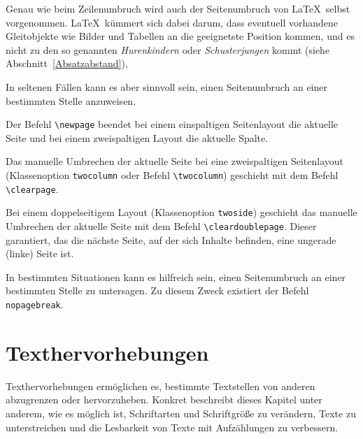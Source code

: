 \documentclass[a4paper,10pt,twoside]{scrbook}
\begin{document}
Genau wie beim Zeilenumbruch wird auch 
der Seitenumbruch von \LaTeX\ selbst
vorgenommen. \LaTeX\ kümmert sich dabei 
darum, dass eventuell vorhandene
Gleitobjekte wie Bilder und Tabellen an die geeignetste Position 
kommen, und es nicht zu den so genannten
\textsl{Hurenkindern} oder \textsl{Schusterjungen} kommt (siehe Abschnitt~\ref{Absatzabstand}),

In seltenen Fällen kann es aber sinnvoll sein,
einen Seitenumbruch an einer bestimmten Stelle anzuweisen.


Der Befehl \verb!\newpage!  
beendet bei einem einspaltigen Seitenlayout 
die aktuelle Seite und bei einem zweispaltigen 
Layout die aktuelle Spalte. 



Das manuelle Umbrechen der aktuelle Seite bei eine zweispaltigen Seitenlayout (Klassenoption \verb!twocolumn! oder Befehl \verb!\twocolumn!) geschieht mit dem Befehl \verb!\clearpage!.  


Bei einem doppelseitigem Layout (Klassenoption \verb!twoside!) geschieht das manuelle Umbrechen der aktuelle Seite mit dem Befehl 
\verb!\cleardoublepage!.  
Dieser garantiert, das die nächste Seite, auf der sich Inhalte befinden, eine ungerade (linke) Seite ist.


In bestimmten Situationen kann es hilfreich sein, einen Seitenumbruch an einer bestimmten Stelle zu untersagen. Zu diesem Zweck existiert der Befehl \verb!nopagebreak!.


\chapter{Texthervorhebungen}
\label{KapitelTexthervorhebungen}

Texthervorhebungen ermöglichen es, bestimmte 
Textstellen von anderen abzugrenzen oder hervorzuheben. Konkret beschreibt dieses
Kapitel unter anderem, wie es möglich ist, Schriftarten und Schriftgröße zu verändern, 
Texte zu unterstreichen und die Lesbarkeit von Texte mit Aufzählungen zu verbessern.
\end{document}
